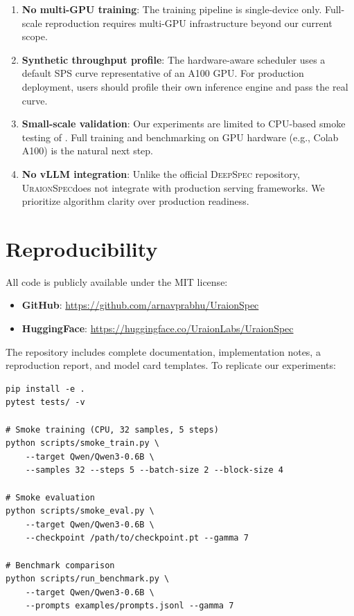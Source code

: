 \documentclass[11pt,a4paper]{article}
\newcommand{\UraionSpec}{\textsc{UraionSpec}}
\newcommand{\DeepSpec}{\textsc{DeepSpec}}
\begin{document}
\begin{enumerate}
  \item \textbf{No multi-GPU training}: The training pipeline is
    single-device only. Full-scale reproduction requires multi-GPU
    infrastructure beyond our current scope.
  \item \textbf{Synthetic throughput profile}: The hardware-aware scheduler
    uses a default SPS curve representative of an A100 GPU. For
    production deployment, users should profile their own inference engine
    and pass the real curve.
  \item \textbf{Small-scale validation}: Our experiments are limited to
    CPU-based smoke testing of . Full training and
    benchmarking on GPU hardware (e.g., Colab A100) is the natural next
    step.
  \item \textbf{No vLLM integration}: Unlike the official \DeepSpec{}
    repository, \UraionSpec does not integrate with production serving
    frameworks. We prioritize algorithm clarity over production readiness.
\end{enumerate}

\section{Reproducibility}
\label{sec:reproducibility}

All code is publicly available under the MIT license:

\begin{itemize}
  \item \textbf{GitHub}: \url{https://github.com/arnavprabhu/UraionSpec}
  \item \textbf{HuggingFace}: \url{https://huggingface.co/UraionLabs/UraionSpec}
\end{itemize}

The repository includes complete documentation, implementation notes, a
reproduction report, and model card templates. To replicate our experiments:
\begin{verbatim}
pip install -e .
pytest tests/ -v

# Smoke training (CPU, 32 samples, 5 steps)
python scripts/smoke_train.py \
    --target Qwen/Qwen3-0.6B \
    --samples 32 --steps 5 --batch-size 2 --block-size 4

# Smoke evaluation
python scripts/smoke_eval.py \
    --target Qwen/Qwen3-0.6B \
    --checkpoint /path/to/checkpoint.pt --gamma 7

# Benchmark comparison
python scripts/run_benchmark.py \
    --target Qwen/Qwen3-0.6B \
    --prompts examples/prompts.jsonl --gamma 7
\end{verbatim}
\end{document}

